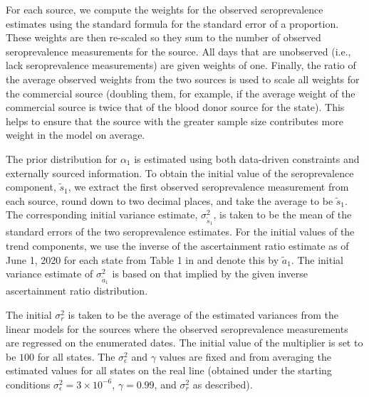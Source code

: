 For each source, we compute the weights for the observed seroprevalence
estimates using the standard formula for the standard error of a proportion.
These weights are then re-scaled so they sum to the number of observed
seroprevalence measurements for the source. All days that are unobserved (i.e.,
lack seroprevalence measurements) are given weights of one. Finally, the ratio 
of the average observed weights from the two sources is used to scale all weights
for the commercial source (doubling them, for example, if the average weight
of the commercial source is twice that of the blood donor source for the state). 
This helps to ensure that the source with the greater sample size contributes 
more weight in the model on average.

The prior distribution for $\alpha_1$ is estimated using both data-driven
constraints and externally sourced information. To obtain the initial value of
the seroprevalence component, $\tilde{s}_{1}$, we extract the first observed
seroprevalence measurement from each source, round down to two decimal places,
and take the average to be $\tilde{s}_{1}$. The corresponding initial variance
estimate, $\sigma^2_{\tilde{s}_{1}}$, is taken to be the mean of the standard
errors of the two seroprevalence estimates. For the initial values of the
trend components, we use the inverse of the ascertainment ratio estimate as of
June 1, 2020 for each state from Table 1 in \citep{unwin2020state} and denote
this by $\tilde{a}_1$. The initial variance estimate of $\sigma^2_{\tilde{a}_1}$
is based on that implied by the given inverse ascertainment ratio
distribution.

The initial $\sigma^2_r$ is taken to be the average of the estimated variances
from the linear models for the sources where the observed seroprevalence
measurements are regressed on the enumerated dates. The initial value of 
the multiplier is set to be $100$ for all states. The $\sigma^2_\epsilon$ and $\gamma$ 
values are fixed and from averaging the estimated values for all states on the real line
(obtained under the starting conditions $\sigma^2_\epsilon = 3\times
10^{-6}$,%
$\gamma = 0.99$,
and $\sigma^2_r$ as described).

